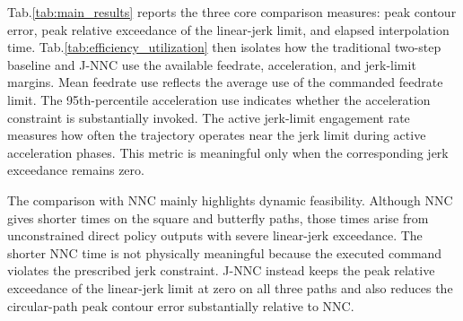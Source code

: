 \documentclass[preprint,12pt]{elsarticle}
\newcommand{\tabref}[1]{Tab.\nobreakspace\ref{#1}}
\begin{document}
\begin{table}[H]
\centering
\caption{Efficiency and dynamic-limit use for J-NNC and the traditional two-step baseline.}
\label{tab:efficiency_utilization}
\end{table}

\tabref{tab:main_results} reports the three core comparison measures: peak contour error, peak relative exceedance of the linear-jerk limit, and elapsed interpolation time. \tabref{tab:efficiency_utilization} then isolates how the traditional two-step baseline and J-NNC use the available feedrate, acceleration, and jerk-limit margins. Mean feedrate use reflects the average use of the commanded feedrate limit. The 95th-percentile acceleration use indicates whether the acceleration constraint is substantially invoked. The active jerk-limit engagement rate measures how often the trajectory operates near the jerk limit during active acceleration phases. This metric is meaningful only when the corresponding jerk exceedance remains zero.

The comparison with NNC mainly highlights dynamic feasibility. Although NNC gives shorter times on the square and butterfly paths, those times arise from unconstrained direct policy outputs with severe linear-jerk exceedance. The shorter NNC time is not physically meaningful because the executed command violates the prescribed jerk constraint. J-NNC instead keeps the peak relative exceedance of the linear-jerk limit at zero on all three paths and also reduces the circular-path peak contour error substantially relative to NNC.
\end{document}
